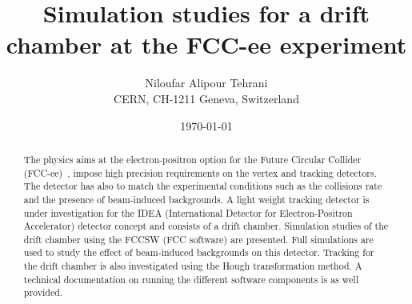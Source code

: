 \documentclass{cernatsnote}
\title{Simulation studies for a drift chamber at the FCC-ee experiment}
\author{
	Niloufar Alipour Tehrani \; \\
	CERN, CH-1211 Geneva, Switzerland
}
\date{\today}
\begin{document}
\maketitle

\begin{abstract}
	The physics aims at the electron-positron option for  the Future Circular Collider (FCC-ee)~\cite{Gomez-Ceballos:2013zzn}, impose high precision requirements on the vertex and tracking detectors.  The detector has also to match the experimental conditions such as the collisions rate and the presence of beam-induced backgrounds.
	A light weight tracking detector is under investigation for the IDEA (International Detector for Electron-Positron Accelerator) detector concept and consists of a drift chamber. Simulation studies of the drift chamber using the FCCSW (FCC software) are presented. Full simulations are used to study the effect of beam-induced backgrounds on this detector.
  Tracking for the drift chamber is also investigated using the Hough transformation method. A technical documentation on running the different software components is as well provided.
\end{abstract}
\\ \\ \\

\begingroup
\color{black}
\tableofcontents
\endgroup

\pagebreak










\end{document}
